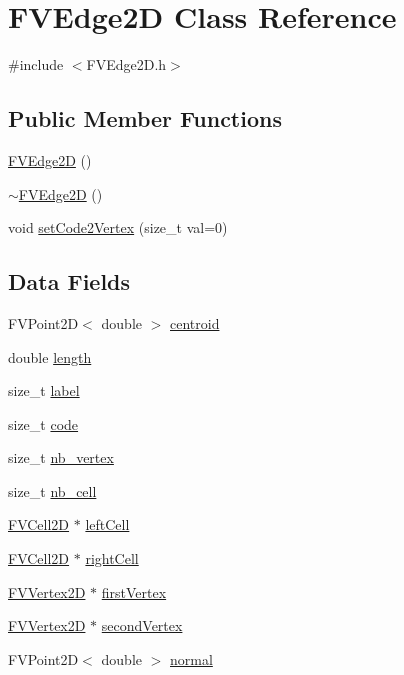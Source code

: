 \hypertarget{classFVEdge2D}{
\section{FVEdge2D Class Reference}
\label{db/d31/classFVEdge2D}
}


{\ttfamily \#include $<$FVEdge2D.h$>$}

\subsection*{Public Member Functions}
\begin{DoxyCompactItemize}
\item 
\hyperlink{classFVEdge2D_a20d5f2080d2c0580547e05bce2158cb6}{FVEdge2D} ()
\item 
\hyperlink{classFVEdge2D_a702a1dbbaaa57169410fd9ae789ca408}{$\sim$FVEdge2D} ()
\item 
void \hyperlink{classFVEdge2D_a0a47b3287cfccb79cba1552f3ad1e7b9}{setCode2Vertex} (size\_\-t val=0)
\end{DoxyCompactItemize}
\subsection*{Data Fields}
\begin{DoxyCompactItemize}
\item 
FVPoint2D$<$ double $>$ \hyperlink{classFVEdge2D_ab3ed78ad91cf05def39147f46817c454}{centroid}
\item 
double \hyperlink{classFVEdge2D_a928b11f5716331f0b89abe7d8d4124b4}{length}
\item 
size\_\-t \hyperlink{classFVEdge2D_a1ec973463c76e6d9e91160720959ad68}{label}
\item 
size\_\-t \hyperlink{classFVEdge2D_acf258c3b3328a96e3ee1e3b875b7874f}{code}
\item 
size\_\-t \hyperlink{classFVEdge2D_a0a063e99fbc85e837d93dfbcda6f5252}{nb\_\-vertex}
\item 
size\_\-t \hyperlink{classFVEdge2D_a1a5a11cfc8bbaa0cf132759c0382da70}{nb\_\-cell}
\item 
\hyperlink{classFVCell2D}{FVCell2D} $\ast$ \hyperlink{classFVEdge2D_aba085f043c4b6ddc571ff574f4c4e3e3}{leftCell}
\item 
\hyperlink{classFVCell2D}{FVCell2D} $\ast$ \hyperlink{classFVEdge2D_a0b77cc6541648a710e72fc0a59cb318d}{rightCell}
\item 
\hyperlink{classFVVertex2D}{FVVertex2D} $\ast$ \hyperlink{classFVEdge2D_aa200b3a3e97b615f25128922c926e1b4}{firstVertex}
\item 
\hyperlink{classFVVertex2D}{FVVertex2D} $\ast$ \hyperlink{classFVEdge2D_ac6bb5fc1a5f4ae86b6d0b5d06d86dc05}{secondVertex}
\item 
FVPoint2D$<$ double $>$ \hyperlink{classFVEdge2D_a5b771cf762f8097181201565a3e7b490}{normal}
\end{DoxyCompactItemize}


